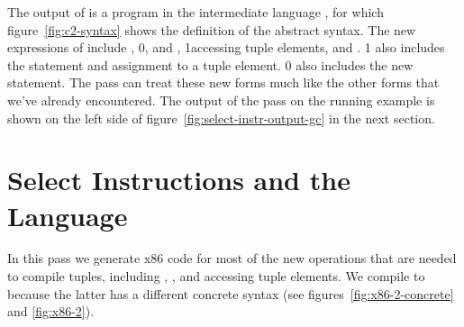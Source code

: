 \documentclass[7x10]{TimesAPriori_MIT}%
\def\racketEd{0}
\def\pythonEd{1}
\def\edition{1}
\newcommand{\racket}[1]{{\if\edition\racketEd{#1}\fi}}
\newcommand{\pythonColor}[0]{}
\newcommand{\python}[1]{{\if\edition\pythonEd\pythonColor #1\fi}}
\numberwithin{theorem}{chapter}
\numberwithin{definition}{chapter}
\numberwithin{equation}{chapter}
\begin{document}
The output of  is a program in the
intermediate language \LangCVec{}, for which figure~\ref{fig:c2-syntax}
shows the definition of the abstract syntax.
%
%
The new expressions of \LangCVec{} include ,
%
\racket{, and ,}
%
\python{accessing tuple elements,}
%
and .
%
\python{\LangCVec{} also includes the  statement and
assignment to a tuple element.}
%
\racket{\LangCVec{} also includes the new \code{collect} statement.}
%
The  pass can treat these new forms much like
the other forms that we've already encountered.  The output of the
 pass on the running example is shown on the
left side of figure~\ref{fig:select-instr-output-gc} in the next
section.


\section{Select Instructions and the \LangXGlobal{} Language}
\label{sec:select-instructions-gc}


In this pass we generate x86 code for most of the new operations that
are needed to compile tuples, including ,
, and accessing tuple elements.
%
We compile  to  because the latter has a
different concrete syntax (see figures~\ref{fig:x86-2-concrete} and
\ref{fig:x86-2}).  
\end{document}
